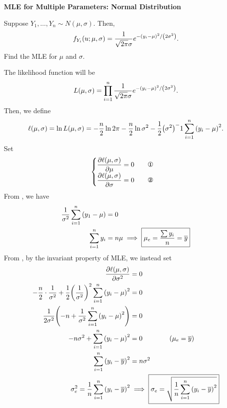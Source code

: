 \begin{eg}
	\textbf{MLE for Multiple Parameters: Normal Distribution}
	\par Suppose $Y_1,\dots,Y_n\sim N(\mu,\sigma)$. Then, \[f_{Y_i}(u;\mu,\sigma)=\dfrac{1}{\sqrt{2\pi}\sigma}e^{-\qty(y_i-\mu)^2/\qty(2\sigma^2)}.\] Find the MLE for $\mu$ and $\sigma$.
	\begin{sol}
		The likelihood function will be \[L(\mu,\sigma)=\prod_{i=1}^n\dfrac{1}{\sqrt{2\pi}\sigma}e^{-\qty(y_i-\mu)^2/\qty(2\sigma^2)}.\] Then, we define \[\ell(\mu,\sigma)=\ln L(\mu,\sigma)=-\dfrac{n}{2}\ln2\pi-\dfrac{n}{2}\ln\sigma^2-\dfrac{1}{2}\qty(\sigma^2)^-1\sum_{i=1}^n\qty(y_i-\mu)^2.\] Set \[\begin{cases}\dsst\pdv{\l(\mu,\sigma)}{\mu}=0\quad\quad\text{\ding{172}}\\\dsst\pdv{\l(\mu,\sigma)}{\sigma}=0\qquad\text{\ding{173}}\end{cases}\] From , we have \begin{align*}\dfrac{1}{\sigma^2}\sum_{i=1}^n\qty(y_1-\mu)&=0\\\sum_{i=1}^ny_i&=n\mu\implies\boxed{\mu_e=\dfrac{\sum y_i}{n}=\overline{y}}\end{align*} From , by the invariant property of MLE, we instead set \begin{align*}\displaystyle\pdv{\ell(\mu,\sigma)}{\sigma^2}&=0\\-\dfrac{n}{2}\cdot\dfrac{1}{\sigma^2}+\dfrac{1}{2}\qty(\dfrac{1}{\sigma^2})^2\sum_{i=1}^n\qty(y_i-\mu)^2&=0\\\dfrac{1}{2\sigma^2}\qty(-n+\dfrac{1}{\sigma^2}\sum_{i=1}^n\qty(y_i-\mu)^2)&=0\\-n\sigma^2+\sum_{i=1}^n\qty(y_i-\mu)^2&=0\qquad\qquad(\mu_e=\overline{y})\\\sum_{i=1}^n\qty(y_i-\overline{y})^2&=n\sigma^2\\\sigma_e^2=\dfrac{1}{n}\sum_{i=1}^n\qty(y_i-\overline{y})^2&\implies\boxed{\sigma_e=\sqrt{\dfrac{1}{n}\sum_{i=1}^n\qty(y_i-\overline{y})^2}}\end{align*}
	\end{sol}
\end{eg}

